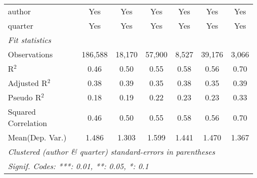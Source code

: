 \begin{tabular}{lcccccc}
   author                                                     & Yes           & Yes           & Yes           & Yes           & Yes            & Yes\\  
   quarter                                                    & Yes           & Yes           & Yes           & Yes           & Yes            & Yes\\  
   \midrule
   \emph{Fit statistics}\\
   Observations                                               & 186,588       & 18,170        & 57,900        & 8,527         & 39,176         & 3,066\\  
   R$^2$                                                      & 0.46          & 0.50          & 0.55          & 0.58          & 0.56           & 0.70\\  
   Adjusted R$^2$                                             & 0.38          & 0.39          & 0.35          & 0.38          & 0.35           & 0.39\\  
   Pseudo R$^2$                                               & 0.18          & 0.19          & 0.22          & 0.23          & 0.23           & 0.33\\  
   Squared Correlation                                        & 0.46          & 0.50          & 0.55          & 0.58          & 0.56           & 0.70\\  
Mean(Dep. Var.) & 1.486 & 1.303 & 1.599 & 1.441 & 1.470 & 1.367 \\
   \midrule \midrule
   \multicolumn{7}{l}{\emph{Clustered (author \& quarter) standard-errors in parentheses}}\\
   \multicolumn{7}{l}{\emph{Signif. Codes: ***: 0.01, **: 0.05, *: 0.1}}\\
\end{tabular}
\par\endgroup
